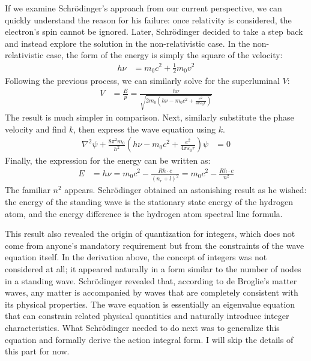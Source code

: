 \documentclass[a4paper, 12pt, oneside, onecolumn]{article}
\begin{document}
\begin{multicols}{2}
If we examine Schrödinger's approach from our current perspective, we can quickly understand the reason for his failure: once relativity is considered, the electron's spin cannot be ignored. Later, Schrödinger decided to take a step back and instead explore the solution in the non-relativistic case. In the non-relativistic case, the form of the energy is simply the square of the velocity:
\begin{align}
	h \nu
	&= m_0c^2 + \frac{1}{2} m_0 v^2
\end{align}
Following the previous process, we can similarly solve for the superluminal $V$:
\begin{align}
	V
	&= \frac{E}{p} = \frac{h \nu}{\sqrt{2 m_0 \left( h \nu - m_0 c^2 + \frac{e^2}{4 \pi \varepsilon_0 r} \right)}}
\end{align}
The result is much simpler in comparison. Next, similarly substitute the phase velocity and find $k$, then express the wave equation using $k$.
\begin{align}
	\nabla^2 \psi + \frac{8 \pi^2 m_0}{h^2} \left( h \nu - m_0 c^2 + \frac{e^2}{4 \pi \varepsilon_0 r} \right) \psi
	&= 0
\end{align}
Finally, the expression for the energy can be written as:
\begin{align}
	E
	&= h \nu = m_0 c^2 - \frac{Rh \cdot c}{\left( n_r + l \right)^2} = m_0 c^2 - \frac{Rh \cdot c}{n^2}
\end{align}
The familiar $n^2$ appears. Schrödinger obtained an astonishing result as he wished: the energy of the standing wave is the stationary state energy of the hydrogen atom, and the energy difference is the hydrogen atom spectral line formula.

This result also revealed the origin of quantization for integers, which does not come from anyone's mandatory requirement but from the constraints of the wave equation itself. In the derivation above, the concept of integers was not considered at all; it appeared naturally in a form similar to the number of nodes in a standing wave. Schrödinger revealed that, according to de Broglie's matter waves, any matter is accompanied by waves that are completely consistent with its physical properties. The wave equation is essentially an eigenvalue equation that can constrain related physical quantities and naturally introduce integer characteristics. What Schrödinger needed to do next was to generalize this equation and formally derive the action integral form. I will skip the details of this part for now. 


\end{multicols}
\end{document}
